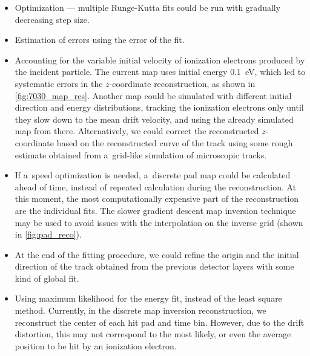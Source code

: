 		\begin{itemize}
			\item Optimization --- multiple Runge-Kutta fits could be run with gradually decreasing step size.
			\item Estimation of errors using the error of the fit.
			\item Accounting for the variable initial velocity of ionization electrons produced by the incident particle. The current map uses initial energy \qty{0.1}{\eV}, which led to systematic errors in the $z$\nobreakdash-coordinate reconstruction, as shown in \cref{fig:7030_map_res}. Another map could be simulated with different initial direction and energy distributions, tracking the ionization electrons only until they slow down to the mean drift velocity, and using the already simulated map from there. Alternatively, we could correct the reconstructed $z$\nobreakdash-coordinate based on the reconstructed curve of the track using some rough estimate obtained from a~grid-like simulation of microscopic tracks.
			\item If a~speed optimization is needed, a~discrete pad map could be calculated ahead of time, instead of repeated calculation during the reconstruction. At this moment, the most computationally expensive part of the reconstruction are the individual fits. The slower gradient descent map inversion technique may be used to avoid issues with the interpolation on the inverse grid (shown in \cref{fig:pad_reco}).
			\item At the end of the fitting procedure, we could refine the origin and the initial direction of the track obtained from the previous detector layers with some kind of global fit.
			\item Using maximum likelihood for the energy fit, instead of the least square method. Currently, in the discrete map inversion reconstruction, we reconstruct the center of each hit pad and time bin. However, due to the drift distortion, this may not correspond to the most likely, or even the average position to be hit by an ionization electron.
			

\end{itemize}
